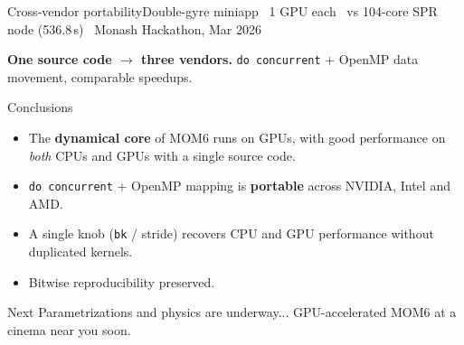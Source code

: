 \documentclass[aspectratio=169]{beamer}
\begin{document}
\begin{frame}{Cross-vendor portability}{Double-gyre miniapp \textperiodcentered\ 1 GPU each \textperiodcentered\ vs 104-core SPR node (536.8\,s) \textperiodcentered\ Monash Hackathon, Mar 2026}
  \centering
  \vspace{.5em}

  \textbf{One source code $\to$ three vendors.} \texttt{do concurrent} + OpenMP data movement, comparable speedups.
\end{frame}

\begin{frame}{Conclusions}
  \begin{itemize}
    \item The \textbf{dynamical core} of MOM6 runs on GPUs, with good performance on \emph{both} CPUs and GPUs with a single source code.
    \item \texttt{do concurrent} + OpenMP mapping is \textbf{portable} across NVIDIA, Intel and AMD.
    \item A single knob (\texttt{bk} / stride) recovers CPU and GPU performance without duplicated kernels.
    \item Bitwise reproducibility preserved.
  \end{itemize}
  \vfill
  \begin{exampleblock}{Next}
    Parametrizations and physics are underway... GPU-accelerated MOM6 at a cinema near you soon.
  \end{exampleblock}
\end{frame}
\end{document}
